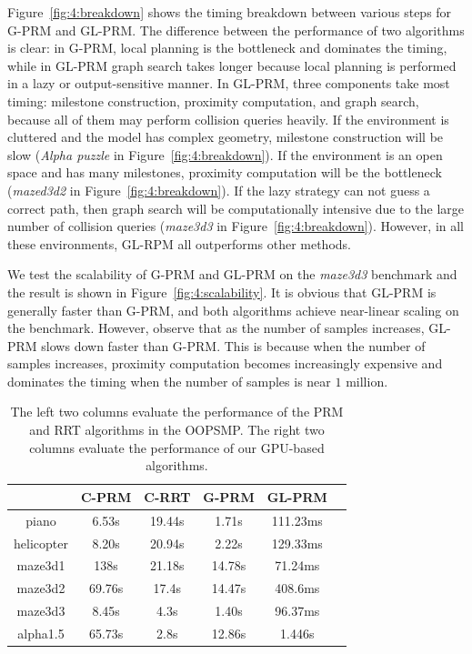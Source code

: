 Figure~\ref{fig:4:breakdown} shows the timing breakdown between various steps for G-PRM and GL-PRM. The difference between the performance of two algorithms is clear: in G-PRM, local planning is the bottleneck and dominates the timing, while in GL-PRM graph search takes longer because local planning is performed in a lazy or output-sensitive manner. In GL-PRM, three components take most timing: milestone construction, proximity computation, and graph search, because all of them may perform collision queries heavily. If the environment is cluttered and the model has complex geometry, milestone construction will be slow (\emph{Alpha puzzle} in Figure~\ref{fig:4:breakdown}). If the environment is an open space and has many milestones, proximity computation will be the bottleneck (\emph{mazed3d2} in Figure~\ref{fig:4:breakdown}). If the lazy strategy can not guess a correct path, then graph search will be computationally intensive due to the large number of collision queries (\emph{maze3d3} in Figure~\ref{fig:4:breakdown}). However, in all these environments, GL-RPM all outperforms other methods.

We test the scalability of G-PRM and GL-PRM on the \emph{maze3d3} benchmark and the result is shown in Figure~\ref{fig:4:scalability}. It is obvious that GL-PRM is generally faster than G-PRM, and both algorithms achieve near-linear scaling on the benchmark. However, observe that as the number of samples increases, GL-PRM slows down faster than G-PRM. This is because when the number of samples increases, proximity computation becomes increasingly expensive and dominates the timing when the number of samples is near $1$ million.

\begin{table}[htb]
\begin{center}
\begin{small}
\begin{tabular}{|c|c|c|c|c|c|} \hline
               & C-PRM & C-RRT & G-PRM & GL-PRM \\ \hline \hline
piano          & 6.53s   &  19.44s &   1.71s   &     111.23ms      \\  \hline
helicopter          & 8.20s     &  20.94s    &  2.22s    &  129.33ms      \\ \hline
maze3d1        & 138s  &  21.18s    &     14.78s &     71.24ms    \\ \hline
maze3d2        & 69.76s &  17.4s   &   14.47s   &      408.6ms   \\ \hline
maze3d3        & 8.45s   &   4.3s   &  1.40s    &     96.37ms    \\ \hline
alpha1.5       & 65.73s  &   2.8s   &    12.86s  &   1.446s      \\ \hline
\end{tabular}
\end{small}
\end{center}
\caption[Performance comparison between the PRM and RRT implementations in OOPSMP and the GPU-based planner]{The left two columns evaluate the performance of the PRM and RRT algorithms in the OOPSMP. The right two columns evaluate the performance of our GPU-based algorithms.}\label{tab:4:complexity}
\end{table}

